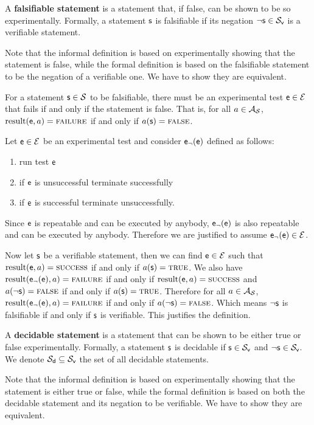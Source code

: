 \documentclass[11pt,letterpaper,fleqn]{memoir} %
\begin{document}
\begin{mathSection}
	\begin{defn}
		A \textbf{falsifiable statement} is a statement that, if false, can be shown to be so experimentally. Formally, a statement $\mathsf{s}$ is falsifiable if its negation $\neg\mathsf{s} \in \mathcal{S}_\textsf{v}$ is a verifiable statement.
	\end{defn}
	\begin{justification}
		Note that the informal definition is based on experimentally showing that the statement is false, while the formal definition is based on the falsifiable statement to be the negation of a verifiable one. We have to show they are equivalent.
		
		For a statement $\mathsf{s} \in \mathcal{S}$ to be falsifiable, there must be an experimental test $\mathsf{e} \in \mathcal{E}$ that fails if and only if the statement is false. That is, for all $a \in \mathcal{A}_{\mathcal{S}}$, $\operatorname{result}(\mathsf{e}, a) = \textsc{failure}$ if and only if $a(\mathsf{s}) = \textsc{false}$.
		
		Let $\mathsf{e} \in \mathcal{E}$ be an experimental test and consider $\mathsf{e}_\neg(\mathsf{e})$ defined as follows:
		\begin{enumerate}
			\item run test $\mathsf{e}$
			\item if $\mathsf{e}$ is unsuccessful terminate successfully
			\item if $\mathsf{e}$ is successful terminate unsuccessfully.
		\end{enumerate}
		Since $\mathsf{e}$ is repeatable and can be executed by anybody, $\mathsf{e}_\neg(\mathsf{e})$ is also repeatable and can be executed by anybody. Therefore we are justified to assume $\mathsf{e}_\neg(\mathsf{e}) \in \mathcal{E}$.
		
		Now let $\mathsf{s}$ be a verifiable statement, then we can find $\mathsf{e} \in \mathcal{E}$ such that $\operatorname{result}(\mathsf{e}, a) = \textsc{success}$ if and only if $a(\mathsf{s}) = \textsc{true}$. We also have $\operatorname{result}(\mathsf{e}_\neg(\mathsf{e}), a) = \textsc{failure}$ if and only if $\operatorname{result}(\mathsf{e}, a) = \textsc{success}$ and $a(\neg\mathsf{s}) = \textsc{false}$ if and only if $a(\mathsf{s}) = \textsc{true}$. Therefore for all $a \in \mathcal{A}_{\mathcal{S}}$, $\operatorname{result}(\mathsf{e}_\neg(\mathsf{e}), a) = \textsc{failure}$ if and only if $a(\neg\mathsf{s}) = \textsc{false}$. Which means $\neg\mathsf{s}$ is falsifiable if and only if $\mathsf{s}$ is verifiable. This justifies the definition.
	\end{justification}
	\begin{defn}
		A \textbf{decidable statement} is a statement that can be shown to be either true or false experimentally. Formally, a statement $\mathsf{s}$ is decidable if $\mathsf{s} \in \mathcal{S}_\textsf{v}$ and $\neg\mathsf{s} \in \mathcal{S}_\textsf{v}$. We denote $\mathcal{S}_\textsf{d} \subseteq \mathcal{S}_\textsf{v}$ the set of all decidable statements.
	\end{defn}
	\begin{justification}
		Note that the informal definition is based on experimentally showing that the statement is either true or false, while the formal definition is based on both the decidable statement and its negation to be verifiable. We have to show they are equivalent.
		

\end{justification}
\end{mathSection}
\end{document}
